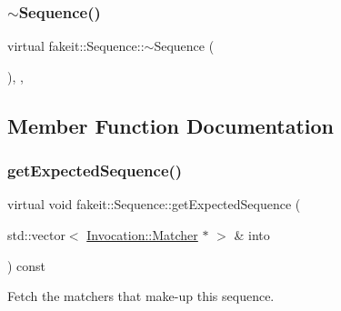 \subsubsection{\texorpdfstring{$\sim$Sequence()}{~Sequence()}\hspace{0.1cm}{\footnotesize\ttfamily [9/9]}}
{\footnotesize\ttfamily virtual fakeit\+::\+Sequence\+::$\sim$\+Sequence (\begin{DoxyParamCaption}{ }\end{DoxyParamCaption})\hspace{0.3cm}{\ttfamily [inline]}, {\ttfamily [protected]}, {\ttfamily [virtual]}}



\subsection{Member Function Documentation}
\mbox{\label{classfakeit_1_1Sequence_aa1a1e4ad2fcac3379ba38f250bf06884}} 
\subsubsection{\texorpdfstring{getExpectedSequence()}{getExpectedSequence()}\hspace{0.1cm}{\footnotesize\ttfamily [1/9]}}
{\footnotesize\ttfamily virtual void fakeit\+::\+Sequence\+::get\+Expected\+Sequence (\begin{DoxyParamCaption}\item[{std\+::vector$<$ \mbox{\hyperlink{structfakeit_1_1Invocation_1_1Matcher}{Invocation\+::\+Matcher}} $\ast$ $>$ \&}]{into }\end{DoxyParamCaption}) const\hspace{0.3cm}{\ttfamily [pure virtual]}}



Fetch the matchers that make-\/up this sequence. 



